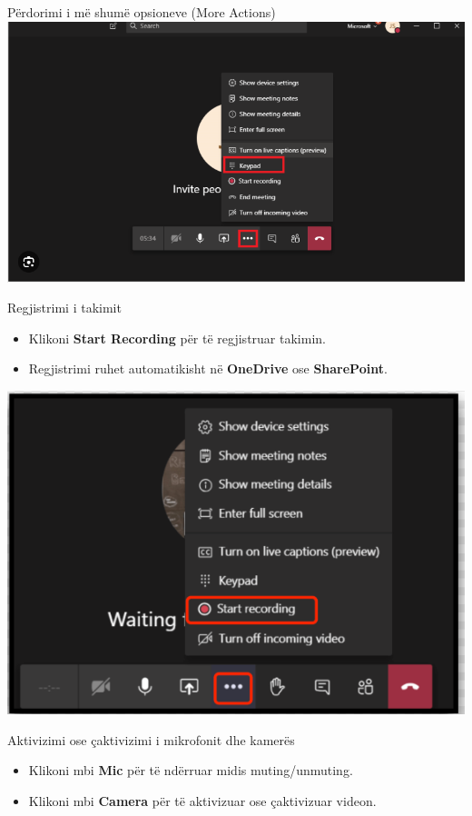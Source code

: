 \documentclass[
  ignorenonframetext,
]{beamer}
\begin{document}
\begin{frame}{Përdorimi i më shumë opsioneve (More Actions)}
\label{puxebrdorimi-i-muxeb-shumuxeb-opsioneve-more-actions-1}
\includegraphics{./images/teams15.png}
\end{frame}

\begin{frame}{Regjistrimi i takimit}
\label{regjistrimi-i-takimit}
\begin{itemize}
\item
  Klikoni \textbf{Start Recording} për të regjistruar takimin.
\item
  Regjistrimi ruhet automatikisht në \textbf{OneDrive} ose
  \textbf{SharePoint}.
\end{itemize}

\includegraphics{./images/teams16.png}
\end{frame}

\begin{frame}{Aktivizimi ose çaktivizimi i mikrofonit dhe kamerës}
\label{aktivizimi-ose-uxe7aktivizimi-i-mikrofonit-dhe-kameruxebs}
\begin{itemize}
\item
  Klikoni mbi \textbf{Mic} për të ndërruar midis muting/unmuting.
\item
  Klikoni mbi \textbf{Camera} për të aktivizuar ose çaktivizuar videon.
\end{itemize}
\end{frame}
\end{document}
